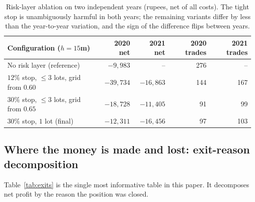 \documentclass[11pt,a4paper]{article}
\begin{document}
\begin{table}[H]
\centering\small
\begin{tabular}{@{}lrrrr@{}}
\toprule
\textbf{Configuration ($h=15$m)} & \textbf{2020 net} & \textbf{2021 net}
& \textbf{2020 trades} & \textbf{2021 trades}\\
\midrule
No risk layer (reference)                    & $-9{,}983$  & --          & 276 & --\\
$12\%$ stop, $\le 3$ lots, grid from $0.60$  & $-39{,}734$ & $-16{,}863$ & 144 & 167\\
$30\%$ stop, $\le 3$ lots, grid from $0.65$  & $-18{,}728$ & $-11{,}405$ & 91  & 99\\
$30\%$ stop, $1$ lot (final)                 & $-12{,}311$ & $-16{,}456$ & 97  & 103\\
\bottomrule
\end{tabular}
\caption{Risk-layer ablation on two independent years (rupees, net of all costs). The
tight stop is unambiguously harmful in both years; the remaining variants differ by less
than the year-to-year variation, and the sign of the difference flips between years.}
\label{tab:ablation}
\end{table}

\subsection{Where the money is made and lost: exit-reason decomposition}\label{sec:stops}

Table~\ref{tab:exits} is the single most informative table in this paper. It decomposes
net profit by the reason the position was closed.
\end{document}
